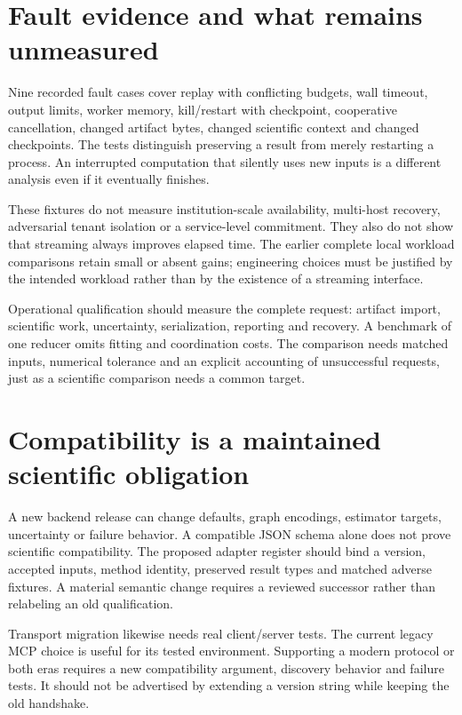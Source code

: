 \section{Fault evidence and what remains unmeasured}

Nine recorded fault cases cover replay with conflicting budgets, wall timeout,
output limits, worker memory, kill/restart with checkpoint, cooperative
cancellation, changed artifact bytes, changed scientific context and changed
checkpoints.\cite{v12_in_runtime} The tests distinguish preserving a result from
merely restarting a process. An interrupted computation that silently uses new
inputs is a different analysis even if it eventually finishes.

These fixtures do not measure institution-scale availability, multi-host
recovery, adversarial tenant isolation or a service-level commitment. They also
do not show that streaming always improves elapsed time. The earlier complete
local workload comparisons retain small or absent gains; engineering choices
must be justified by the intended workload rather than by the existence of a
streaming interface.

Operational qualification should measure the complete request: artifact import,
scientific work, uncertainty, serialization, reporting and recovery. A benchmark
of one reducer omits fitting and coordination costs. The comparison needs
matched inputs, numerical tolerance and an explicit accounting of unsuccessful
requests, just as a scientific comparison needs a common target.

\section{Compatibility is a maintained scientific obligation}

A new backend release can change defaults, graph encodings, estimator targets,
uncertainty or failure behavior. A compatible JSON schema alone does not prove
scientific compatibility. The proposed adapter register should bind a version,
accepted inputs, method identity, preserved result types and matched adverse
fixtures. A material semantic change requires a reviewed successor rather than
relabeling an old qualification.

Transport migration likewise needs real client/server tests. The current legacy
MCP choice is useful for its tested environment. Supporting a modern protocol
or both eras requires a new compatibility argument, discovery behavior and
failure tests. It should not be advertised by extending a version string while
keeping the old handshake.

